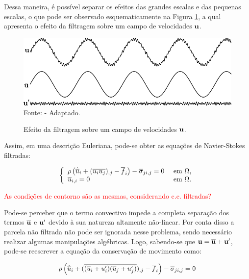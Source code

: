 Dessa maneira, é possível separar os efeitos das grandes escalas e das pequenas escalas, o que pode ser observado esquematicamente na Figura \ref{fig:EfeitoFiltragem}, a qual apresenta o efeito da filtragem sobre um campo de velocidades $\mathbf{u}$.

\begin{figure}[h]
    \centering
    \caption{Efeito da filtragem sobre um campo de velocidades $\mathbf{u}$.}
    \includegraphics[width=.75\linewidth]{Figuras/efeito_filtragem.pdf}
    \\Fonte:  - Adaptado.
    \label{fig:EfeitoFiltragem}
\end{figure}

Assim, em uma descrição Euleriana, pode-se obter as equações de Navier-Stokes filtradas:

\begin{equation}
    \left\{
    \begin{array}{ll}
        \rho\left({\dot{\overline{u}}_i+(\overline{u_iu_j})_{,j}-\overline{f}_i}\right)-\overline{\sigma}_{ji,j}=0 & \text{ em }\Omega\text{,} \\
        \overline{u}_{i,i}=0                                                                       & \text{ em }\Omega\text{.}
    \end{array}
    \right.
\end{equation}

\textcolor{red}{As condições de contorno são as mesmas, considerando c.c. filtradas?}

Pode-se perceber que o termo convectivo impede a completa separação dos termos $\overline{\mathbf{u}}$ e $\mathbf{u}'$ devido à sua natureza altamente não-linear. Por conta disso a parcela não filtrada não pode ser ignorada nesse problema, sendo necessário realizar algumas manipulações algébricas. Logo, sabendo-se que $\mathbf{u}=\overline{\mathbf{u}}+\mathbf{u}'$, pode-se reescrever a equação da conservação de movimento como:

\begin{equation}
    \rho\left({\dot{\overline{u}}_i+(\overline{(\overline{u}_i+u'_i)(\overline{u}_j+u'_j)})_{,j}-\overline{f}_i}\right)-\overline{\sigma}_{ji,j}=0
\end{equation}

